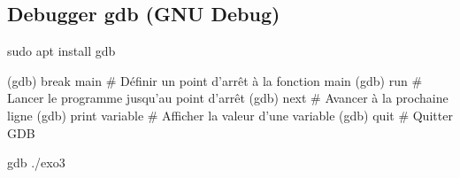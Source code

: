 \subsection*{Debugger gdb (G\+NU Debug)}


\begin{DoxyCode}
sudo apt install gdb

(gdb) break main       # Définir un point d'arrêt à la fonction main
(gdb) run              # Lancer le programme jusqu'au point d'arrêt
(gdb) next             # Avancer à la prochaine ligne
(gdb) print variable   # Afficher la valeur d'une variable
(gdb) quit             # Quitter GDB

gdb ./exo3
\end{DoxyCode}
 